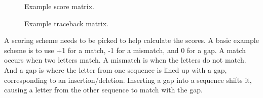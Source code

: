 \documentclass[conference]{IEEEtran}
\begin{document}
\begin{figure}[htbp]
\centerline{}
\caption{Example score matrix. \cite{vladimir}}
\label{1}
\end{figure}

\begin{figure}[htbp]
\centerline{}
\caption{Example traceback matrix. \cite{vladimir}}
\label{2}
\end{figure}

A scoring scheme needs to be picked to help calculate the scores. A basic example scheme is to use +1 for a match, -1 for a mismatch, and 0 for a gap. A match occurs when two letters match. A mismatch is when the letters do not match. And a gap is where the letter from one sequence is lined up with a gap, corresponding to an insertion/deletion. Inserting a gap into a sequence shifts it, causing a letter from the other sequence to match with the gap.
\end{document}
